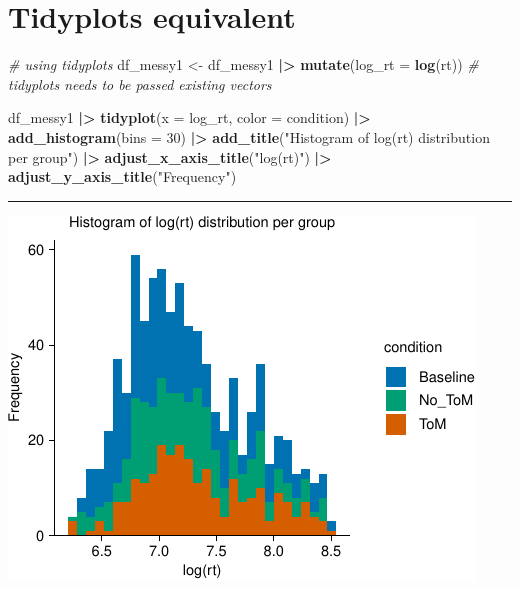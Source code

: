 \documentclass[
]{article}
\newenvironment{Shaded}{\begin{snugshade}}{\end{snugshade}}
\newcommand{\AttributeTok}[1]{\textcolor[rgb]{0.13,0.29,0.53}{#1}}
\newcommand{\CommentTok}[1]{\textcolor[rgb]{0.56,0.35,0.01}{\textit{#1}}}
\newcommand{\DecValTok}[1]{\textcolor[rgb]{0.00,0.00,0.81}{#1}}
\newcommand{\FunctionTok}[1]{\textcolor[rgb]{0.13,0.29,0.53}{\textbf{#1}}}
\newcommand{\NormalTok}[1]{#1}
\newcommand{\OtherTok}[1]{\textcolor[rgb]{0.56,0.35,0.01}{#1}}
\newcommand{\SpecialCharTok}[1]{\textcolor[rgb]{0.81,0.36,0.00}{\textbf{#1}}}
\newcommand{\StringTok}[1]{\textcolor[rgb]{0.31,0.60,0.02}{#1}}
\begin{document}
\hypertarget{tidyplots-equivalent}{%
\section{Tidyplots equivalent}\label{tidyplots-equivalent}}

\begin{Shaded}
\begin{Highlighting}[]
\CommentTok{\# using tidyplots}
\NormalTok{df\_messy1 }\OtherTok{\textless{}{-}}
\NormalTok{  df\_messy1 }\SpecialCharTok{|\textgreater{}}
  \FunctionTok{mutate}\NormalTok{(}\AttributeTok{log\_rt =} \FunctionTok{log}\NormalTok{(rt)) }\CommentTok{\# tidyplots needs to be passed existing vectors}

\NormalTok{df\_messy1 }\SpecialCharTok{|\textgreater{}}
  \FunctionTok{tidyplot}\NormalTok{(}\AttributeTok{x =}\NormalTok{ log\_rt, }\AttributeTok{color =}\NormalTok{ condition) }\SpecialCharTok{|\textgreater{}}
  \FunctionTok{add\_histogram}\NormalTok{(}\AttributeTok{bins =} \DecValTok{30}\NormalTok{) }\SpecialCharTok{|\textgreater{}} 
  \FunctionTok{add\_title}\NormalTok{(}\StringTok{"Histogram of log(rt) distribution per group"}\NormalTok{) }\SpecialCharTok{|\textgreater{}}
  \FunctionTok{adjust\_x\_axis\_title}\NormalTok{(}\StringTok{"log(rt)"}\NormalTok{) }\SpecialCharTok{|\textgreater{}}
  \FunctionTok{adjust\_y\_axis\_title}\NormalTok{(}\StringTok{"Frequency"}\NormalTok{)}
\end{Highlighting}
\end{Shaded}

\begin{center}\rule{0.5\linewidth}{0.5pt}\end{center}

\includegraphics{L5_Checking_Assumptions_pdf_files/figure-latex/unnamed-chunk-21-1.pdf}
\end{document}
